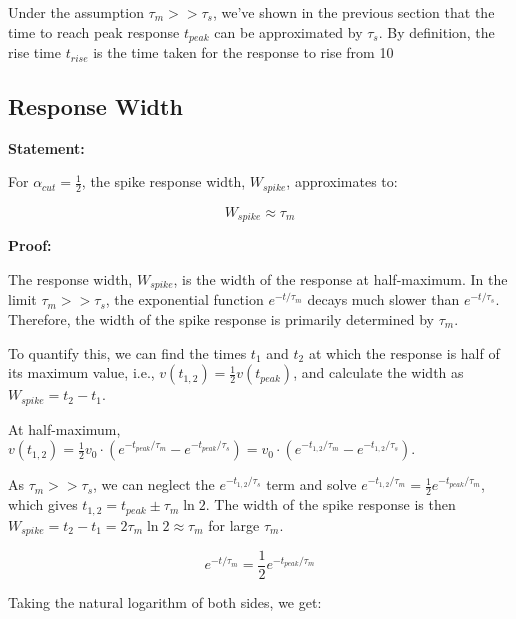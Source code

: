 Under the assumption $\tau_m >> \tau_s$, we've shown in the previous section that the time to reach peak response $t_{peak}$ can be approximated by $\tau_s$. By definition, the rise time $t_{rise}$ is the time taken for the response to rise from 10%

\subsection{Response Width}

\textbf{Statement:}

For $\alpha_{cut} = \frac{1}{2}$, the spike response width, $W_{spike}$, approximates to:

\begin{equation}
W_{spike} \approx \tau_m
\end{equation}

\textbf{Proof:}

The response width, $W_{spike}$, is the width of the response at half-maximum. In the limit $\tau_m >> \tau_s$, the exponential function $e^{-t/\tau_m}$ decays much slower than $e^{-t/\tau_s}$. Therefore, the width of the spike response is primarily determined by $\tau_m$.

To quantify this, we can find the times $t_1$ and $t_2$ at which the response is half of its maximum value, i.e., $v(t_{1,2}) = \frac{1}{2}v(t_{peak})$, and calculate the width as $W_{spike} = t_2 - t_1$.

At half-maximum, $v(t_{1,2}) = \frac{1}{2}v_0 \cdot (e^{-t_{peak}/\tau_m} - e^{-t_{peak}/\tau_s}) = v_0 \cdot (e^{-t_{1,2}/\tau_m} - e^{-t_{1,2}/\tau_s})$.

As $\tau_m >> \tau_s$, we can neglect the $e^{-t_{1,2}/\tau_s}$ term and solve $e^{-t_{1,2}/\tau_m} = \frac{1}{2} e^{-t_{peak}/\tau_m}$, which gives $t_{1,2} = t_{peak} \pm \tau_m \ln 2$. The width of the spike response is then $W_{spike} = t_2 - t_1 = 2 \tau_m \ln 2 \approx \tau_m$ for large $\tau_m$.










\begin{equation}
e^{-t/\tau_m} = \frac{1}{2} e^{-t_{peak}/\tau_m}
\end{equation}

Taking the natural logarithm of both sides, we get:


